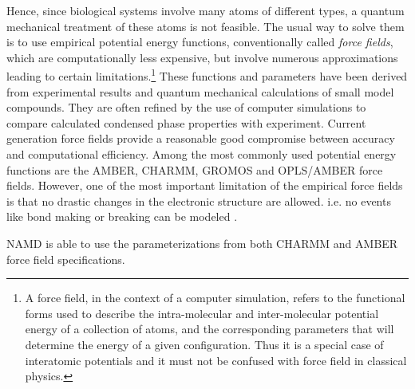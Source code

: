 Hence, since biological systems involve many atoms of different types, a quantum mechanical treatment of these atoms is not feasible. The usual way to solve them is to use empirical potential energy functions, conventionally called \textit{force fields}, which are computationally less expensive, but involve numerous approximations leading to certain limitations.\footnote{A force field, in the context of a computer simulation, refers to the functional forms used to describe the intra-molecular and inter-molecular potential energy of a collection of atoms, and the corresponding parameters that will determine the energy of a given configuration. Thus it is a special case of interatomic potentials and it must not be confused with force field in classical physics.} 
These functions and parameters have been derived from experimental results and quantum mechanical calculations of small model compounds. They are often refined by the use of computer simulations to compare calculated condensed phase properties with experiment.
Current generation force fields provide a reasonable good compromise between accuracy and computational efficiency. 
Among the most commonly used potential energy functions are the AMBER, CHARMM, GROMOS and OPLS/AMBER force fields. However, one of the most important limitation of the empirical force fields is that no drastic changes in the electronic structure are allowed. i.e. no events like bond making or breaking can be modeled \cite{ref:MDsim_Gkeka}.

NAMD is able to use the parameterizations from both CHARMM and AMBER force field specifications.

%

